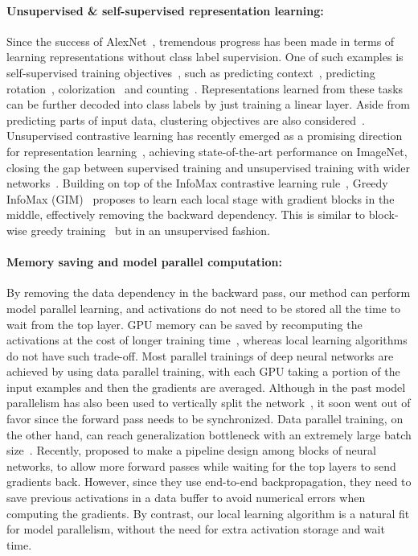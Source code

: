 \paragraph{Unsupervised \& self-supervised representation learning:} Since the success of
AlexNet~\cite{alexnet}, tremendous progress has been made in terms of learning representations
without class label supervision. One of such examples is self-supervised training
objectives~\cite{selfsupbench}, such as predicting context~\cite{context,jigsaw}, predicting
rotation~\cite{rotation}, colorization~\cite{colorization} and counting~\cite{counting}.
Representations learned from these tasks can be further decoded into class labels by just training a
linear layer. Aside from predicting parts of input data, clustering objectives are also
considered~\cite{localagg,deepcluster}. Unsupervised contrastive learning has recently emerged as a
promising direction for representation learning~\cite{cpc,cmc,moco,pirl,simclr}, achieving
state-of-the-art performance on ImageNet, closing the gap between supervised training and
unsupervised training with wider networks~\cite{simclr}. Building on top of the InfoMax contrastive
learning rule~\cite{cpc}, Greedy InfoMax (GIM)~\cite{e2e2e} proposes to learn each local stage with
gradient blocks in the middle, effectively removing the backward dependency. This is similar to
block-wise greedy training~\cite{belilovsky2018greedy} but in an unsupervised fashion. 

\paragraph{Memory saving and model parallel computation:} By removing the data dependency in the
backward pass, our method can perform model parallel learning, and activations do not need to be
stored all the time to wait from the top layer. GPU memory can be saved by recomputing the
activations at the cost of longer training time~\cite{sublinear,dp,revnet}, whereas local learning
algorithms do not have such trade-off. Most parallel trainings of deep neural networks are achieved
by using data parallel training, with each GPU taking a portion of the input examples and then the
gradients are averaged. Although in the past model parallelism has also been used to vertically
split the network~\cite{alexnet,weirdtrick}, it soon went out of favor since the forward pass needs
to be synchronized. Data parallel training, on the other hand, can reach generalization bottleneck
with an extremely large batch size~\cite{dataparallel}. Recently, \cite{huang2019gpipe,pipedream}
proposed to make a pipeline design among blocks of neural networks, to allow more forward passes
while waiting for the top layers to send gradients back. However, since they use end-to-end
backpropagation, they need to save previous activations in a data buffer to avoid numerical errors
when computing the gradients. By contrast, our local learning algorithm is a natural fit for model
parallelism, without the need for extra activation storage and wait time.